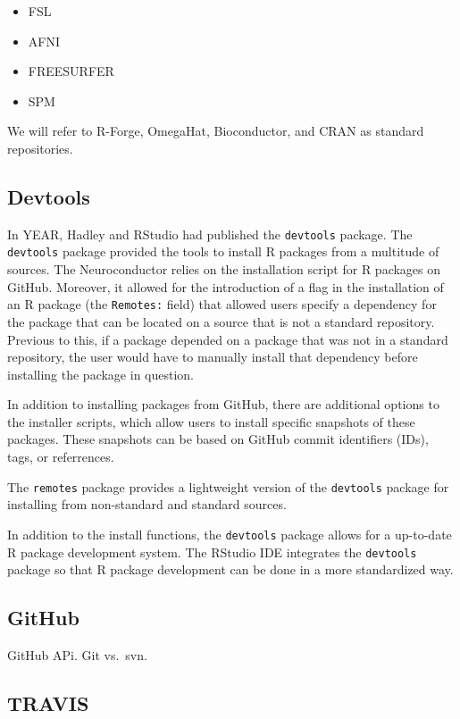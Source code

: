 \documentclass[]{elsarticle} %
\providecommand{\tightlist}{%
  \setlength{\itemsep}{0pt}\setlength{\parskip}{0pt}}
\begin{document}
\begin{itemize}
\tightlist
\item
  FSL
\item
  AFNI
\item
  FREESURFER
\item
  SPM
\end{itemize}

We will refer to R-Forge, OmegaHat, Bioconductor, and CRAN as standard
repositories.

\subsection{Devtools}\label{devtools}

In YEAR, Hadley and RStudio had published the \texttt{devtools} package.
The \texttt{devtools} package provided the tools to install R packages
from a multitude of sources. The Neuroconductor relies on the
installation script for R packages on GitHub. Moreover, it allowed for
the introduction of a flag in the installation of an R package (the
\texttt{Remotes:} field) that allowed users specify a dependency for the
package that can be located on a source that is not a standard
repository. Previous to this, if a package depended on a package that
was not in a standard repository, the user would have to manually
install that dependency before installing the package in question.

In addition to installing packages from GitHub, there are additional
options to the installer scripts, which allow users to install specific
snapshots of these packages. These snapshots can be based on GitHub
commit identifiers (IDs), tags, or referrences.

The \texttt{remotes} package provides a lightweight version of the
\texttt{devtools} package for installing from non-standard and standard
sources.

In addition to the install functions, the \texttt{devtools} package
allows for a up-to-date R package development system. The RStudio IDE
integrates the \texttt{devtools} package so that R package development
can be done in a more standardized way.

\subsection{GitHub}\label{github}

GitHub APi. Git vs.~svn.

\subsection{TRAVIS}\label{travis}
\end{document}

